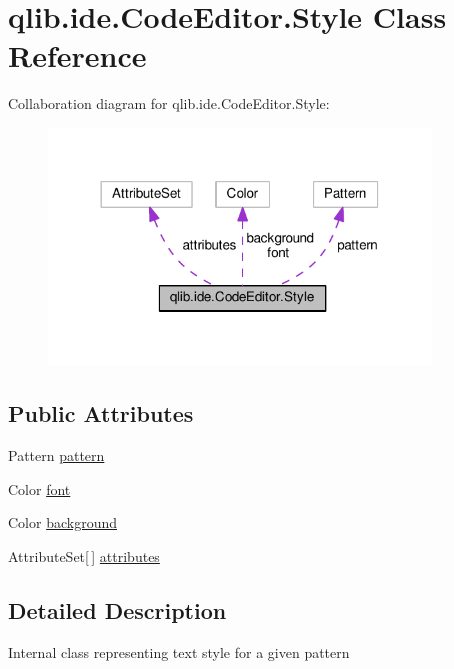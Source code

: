 \hypertarget{classqlib_1_1ide_1_1CodeEditor_1_1Style}{}\section{qlib.\+ide.\+Code\+Editor.\+Style Class Reference}
\label{classqlib_1_1ide_1_1CodeEditor_1_1Style}


Collaboration diagram for qlib.\+ide.\+Code\+Editor.\+Style\+:\nopagebreak
\begin{figure}[H]
\begin{center}
\leavevmode
\includegraphics[width=288pt]{classqlib_1_1ide_1_1CodeEditor_1_1Style__coll__graph}
\end{center}
\end{figure}
\subsection*{Public Attributes}
\begin{DoxyCompactItemize}
\item 
Pattern \hyperlink{classqlib_1_1ide_1_1CodeEditor_1_1Style_a98a1d4a5736741de2806f55f6aa55f1b}{pattern}
\item 
Color \hyperlink{classqlib_1_1ide_1_1CodeEditor_1_1Style_aa248ffd9223379e30577632842250041}{font}
\item 
Color \hyperlink{classqlib_1_1ide_1_1CodeEditor_1_1Style_aa185f06a718f6fffe30637733484a7b8}{background}
\item 
Attribute\+Set\mbox{[}$\,$\mbox{]} \hyperlink{classqlib_1_1ide_1_1CodeEditor_1_1Style_a1798d9186d961170807fe95eead1029d}{attributes}
\end{DoxyCompactItemize}


\subsection{Detailed Description}
Internal class representing text style for a given pattern 

